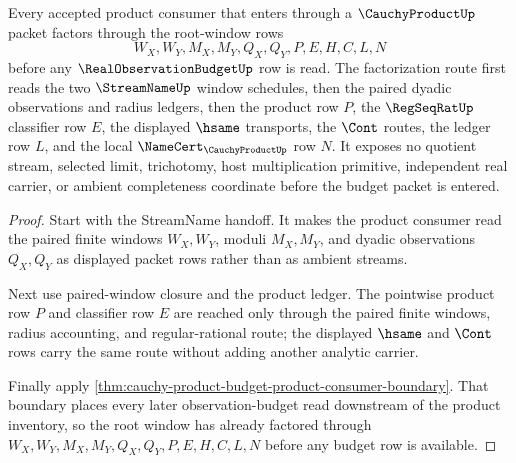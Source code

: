 \begin{theorem}
\label{thm:cauchy-product-root-window-factorization}
Every accepted product consumer that enters through a $\CauchyProductUp$ packet factors through the root-window rows
$$
W_X,W_Y,M_X,M_Y,Q_X,Q_Y,P,E,H,C,L,N
$$
before any $\RealObservationBudgetUp$ row is read. The factorization route first reads the two $\StreamNameUp$ window schedules, then the paired dyadic observations and radius ledgers, then the product row $P$, the $\RegSeqRatUp$ classifier row $E$, the displayed $\hsame$ transports, the $\Cont$ routes, the ledger row $L$, and the local $\NameCert_{\CauchyProductUp}$ row $N$. It exposes no quotient stream, selected limit, trichotomy, host multiplication primitive, independent real carrier, or ambient completeness coordinate before the budget packet is entered.
\end{theorem}
\begin{proof}
Start with the StreamName handoff. It makes the product consumer read the paired finite windows $W_X,W_Y$, moduli $M_X,M_Y$, and dyadic observations $Q_X,Q_Y$ as displayed packet rows rather than as ambient streams.

Next use paired-window closure and the product ledger. The pointwise product row $P$ and classifier row $E$ are reached only through the paired finite windows, radius accounting, and regular-rational route; the displayed $\hsame$ and $\Cont$ rows carry the same route without adding another analytic carrier.

Finally apply \autoref{thm:cauchy-product-budget-product-consumer-boundary}. That boundary places every later observation-budget read downstream of the product inventory, so the root window has already factored through $W_X,W_Y,M_X,M_Y,Q_X,Q_Y,P,E,H,C,L,N$ before any budget row is available.
\end{proof}

